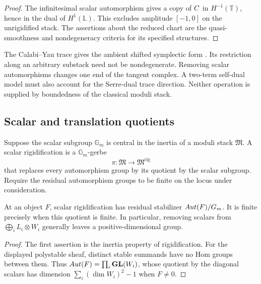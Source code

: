 \begin{proof}
The infinitesimal scalar automorphism gives a copy of $C$ in
$H^{-1}(\mathbb T)$, hence in the dual of $H^1(\mathbb L)$.
This excludes amplitude $[-1,0]$ on the unrigidified stack.
The assertions about the reduced chart are the quasi-smoothness and
nondegeneracy criteria for its specified structures.
\end{proof}

The Calabi--Yau trace gives the ambient shifted symplectic form
\cite{PTVV2013}.  Its restriction along an arbitrary substack need
not be nondegenerate.  Removing scalar automorphisms changes one end
of the tangent complex.  A two-term self-dual model must also account
for the Serre-dual trace direction.  Neither operation is supplied by
boundedness of the classical moduli stack.

\subsection{Scalar and translation quotients}

\begin{definition}
\label{def:retained-rigidification-inertia-datum}
Suppose the scalar subgroup $\mathbb G_m$ is central in the inertia
of a moduli stack $\mathfrak M$.  A scalar rigidification is a
$\mathbb G_m$-gerbe
\[
\pi:\mathfrak M\longrightarrow\mathfrak M^{\mathrm{rig}}
\]
that replaces every automorphism group by its quotient by the scalar
subgroup.  Require the residual automorphism groups to be finite on
the locus under consideration.
\end{definition}

\begin{proposition}
\label{prop:retained-finite-residual-inertia-after-rigidification}
At an object $F$, scalar rigidification has residual stabilizer
$Aut(F)/G_m$.  It is finite precisely when this quotient
is finite.  In particular, removing scalars from
$\bigoplus_i L_i\otimes W_i$ generally leaves a positive-dimensional
group.
\end{proposition}

\begin{proof}
The first assertion is the inertia property of rigidification.
For the displayed polystable sheaf, distinct stable summands have no
Hom groups between them.  Thus
$Aut(F)=\prod_i\mathbf{GL}(W_i)$, whose quotient by the diagonal scalars
has dimension $\sum_i(\dim W_i)^2-1$ when $F\ne0$.
\end{proof}

